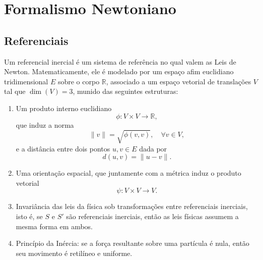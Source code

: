 \documentclass[../../main]{subfiles}
\begin{document}
\chapter{Formalismo Newtoniano}
\label{chap:fisica:formalismo-newtoniano}

\section{Referenciais}
\label{sec:fisica:formalismo-newtoniano:referenciais}

\begin{defn}
    \label{def:fisica:formalismo-newtoniano:referenciais:referencial-inercial}

    Um referencial inercial é um sistema de referência no qual valem as Leis de
    Newton. Matematicamente, ele é modelado por um espaço afim euclidiano
    tridimensional $E$ sobre o corpo $\mathbb{R}$, associado a um espaço
    vetorial de translações $V$ tal que $\dim(V)=3$, munido das seguintes
    estruturas:

    \begin{enumerate}
        \item Um produto interno euclidiano
            \[
                \phi: V \times V \longrightarrow \mathbb{R},
            \]
            que induz a norma
            \[
                \|v\| = \sqrt{\phi(v,v)}, \quad \forall v \in V,
            \]
            e a distância entre dois pontos $u,v \in E$ dada por
            \[
                d(u,v) = \| u - v \|.
            \]

        \item Uma orientação espacial, que juntamente com a métrica induz o
            produto vetorial
            \[
                \psi : V \times V \longrightarrow V.
            \]

        \item Invariância das leis da física sob transformações entre
            referenciais inerciais, isto é, se $S$ e $S'$ são referenciais
            inerciais, então as leis físicas assumem a mesma forma em ambos.

        \item Princípio da Inércia: se a força resultante sobre uma partícula é
            nula, então seu movimento é retilíneo e uniforme.
    \end{enumerate}
\end{defn}
\end{document}
